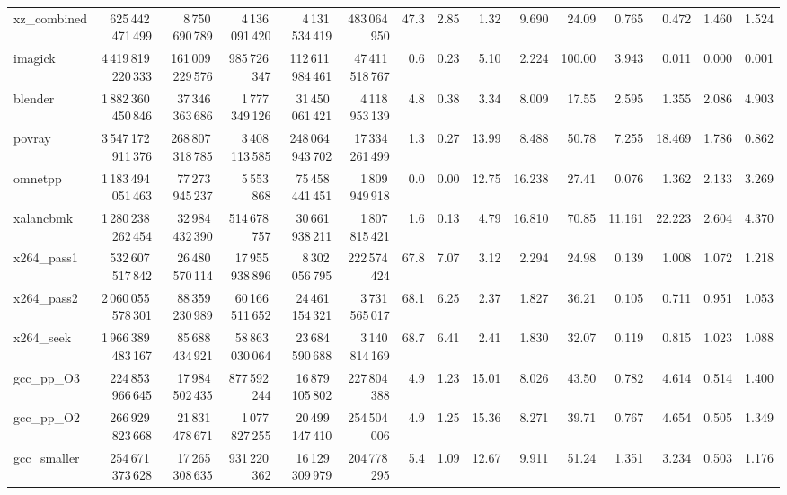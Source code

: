 \documentclass[9pt,landscape,a4paper]{article}
\begin{document}
\begin{adjustbox}{max width=\textwidth, max totalheight=0.50\textheight}
\begin{tabular}{lrrrrrrrrrrrrrr}
xz\_combined & 625\,442\,471\,499 & 8\,750\,690\,789 & 4\,136\,091\,420 & 4\,131\,534\,419 & 483\,064\,950 & 47.3 & 2.85 & 1.32 & 9.690 & 24.09 & 0.765 & 0.472 & 1.460 & 1.524 \\
imagick & 4\,419\,819\,220\,333 & 161\,009\,229\,576 & 985\,726\,347 & 112\,611\,984\,461 & 47\,411\,518\,767 & 0.6 & 0.23 & 5.10 & 2.224 & 100.00 & 3.943 & 0.011 & 0.000 & 0.001 \\
blender & 1\,882\,360\,450\,846 & 37\,346\,363\,686 & 1\,777\,349\,126 & 31\,450\,061\,421 & 4\,118\,953\,139 & 4.8 & 0.38 & 3.34 & 8.009 & 17.55 & 2.595 & 1.355 & 2.086 & 4.903 \\
povray & 3\,547\,172\,911\,376 & 268\,807\,318\,785 & 3\,408\,113\,585 & 248\,064\,943\,702 & 17\,334\,261\,499 & 1.3 & 0.27 & 13.99 & 8.488 & 50.78 & 7.255 & 18.469 & 1.786 & 0.862 \\
omnetpp & 1\,183\,494\,051\,463 & 77\,273\,945\,237 & 5\,553\,868 & 75\,458\,441\,451 & 1\,809\,949\,918 & 0.0 & 0.00 & 12.75 & 16.238 & 27.41 & 0.076 & 1.362 & 2.133 & 3.269 \\
xalancbmk & 1\,280\,238\,262\,454 & 32\,984\,432\,390 & 514\,678\,757 & 30\,661\,938\,211 & 1\,807\,815\,421 & 1.6 & 0.13 & 4.79 & 16.810 & 70.85 & 11.161 & 22.223 & 2.604 & 4.370 \\
x264\_pass1 & 532\,607\,517\,842 & 26\,480\,570\,114 & 17\,955\,938\,896 & 8\,302\,056\,795 & 222\,574\,424 & 67.8 & 7.07 & 3.12 & 2.294 & 24.98 & 0.139 & 1.008 & 1.072 & 1.218 \\
x264\_pass2 & 2\,060\,055\,578\,301 & 88\,359\,230\,989 & 60\,166\,511\,652 & 24\,461\,154\,321 & 3\,731\,565\,017 & 68.1 & 6.25 & 2.37 & 1.827 & 36.21 & 0.105 & 0.711 & 0.951 & 1.053 \\
x264\_seek & 1\,966\,389\,483\,167 & 85\,688\,434\,921 & 58\,863\,030\,064 & 23\,684\,590\,688 & 3\,140\,814\,169 & 68.7 & 6.41 & 2.41 & 1.830 & 32.07 & 0.119 & 0.815 & 1.023 & 1.088 \\
gcc\_pp\_O3 & 224\,853\,966\,645 & 17\,984\,502\,435 & 877\,592\,244 & 16\,879\,105\,802 & 227\,804\,388 & 4.9 & 1.23 & 15.01 & 8.026 & 43.50 & 0.782 & 4.614 & 0.514 & 1.400 \\
gcc\_pp\_O2 & 266\,929\,823\,668 & 21\,831\,478\,671 & 1\,077\,827\,255 & 20\,499\,147\,410 & 254\,504\,006 & 4.9 & 1.25 & 15.36 & 8.271 & 39.71 & 0.767 & 4.654 & 0.505 & 1.349 \\
gcc\_smaller & 254\,671\,373\,628 & 17\,265\,308\,635 & 931\,220\,362 & 16\,129\,309\,979 & 204\,778\,295 & 5.4 & 1.09 & 12.67 & 9.911 & 51.24 & 1.351 & 3.234 & 0.503 & 1.176 \\

\end{tabular}
\end{adjustbox}
\end{document}
